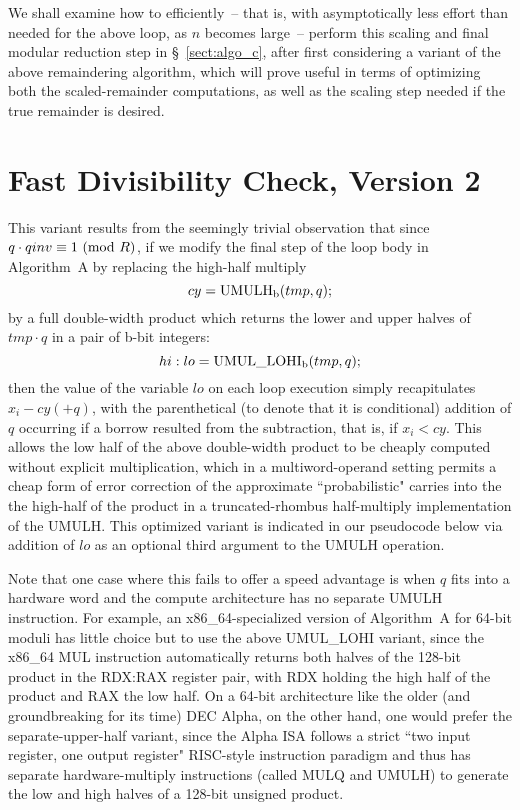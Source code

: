 \documentclass{article}
\begin{document}
We shall examine how to efficiently~-- that is, with asymptotically less effort than needed for the above loop, as $n$ becomes large~-- perform this scaling and final modular reduction step in \S~\ref{sect:algo_c}, after first considering a variant of the above remaindering algorithm, which will prove useful in terms of optimizing both the scaled-remainder computations, as well as the scaling step needed if the true remainder is desired.



\section{Fast Divisibility Check, Version 2}
\label{sect:algo_b}

This variant results from the seemingly trivial observation that since $q \cdot qinv \equiv 1\ ({\rm mod}\ R)$, if we modify the final step of the loop body in Algorithm~A by replacing the high-half multiply
$$
	cy = {\rm UMULH_b}(tmp, q);
$$
by a full double-width product which returns the lower and upper halves of $tmp \cdot q$ in a pair of b-bit integers:
$$
	hi:lo = {\rm UMUL\_LOHI_b}(tmp, q);
$$
then the value of the variable $lo$ on each loop execution simply recapitulates $x_i - cy (+ q)$, with the parenthetical (to denote that it is conditional) addition of $q$ occurring if a borrow resulted from the subtraction, that is, if $x_i < cy$. This allows the low half of the above double-width product to be cheaply computed without explicit multiplication, which in a multiword-operand setting permits a cheap form of error correction of the approximate ``probabilistic" carries into the the high-half of the product in a truncated-rhombus half-multiply implementation of the UMULH. This optimized variant is indicated in our pseudocode below via addition of $lo$ as an optional third argument to the UMULH operation.

Note that one case where this fails to offer a speed advantage is when $q$ fits into a hardware word and the compute architecture has no separate UMULH instruction. For example, an x86\_64-specialized version of Algorithm~A for 64-bit moduli has little choice but to use the above UMUL\_LOHI variant, since the x86\_64 MUL instruction automatically returns both halves of the 128-bit product in the RDX:RAX register pair, with RDX holding the high half of the product and RAX the low half. On a 64-bit architecture like the older (and groundbreaking for its time) DEC Alpha, on the other hand, one would prefer the separate-upper-half variant, since the Alpha ISA follows a strict ``two input register, one output register" RISC-style instruction paradigm and thus has separate hardware-multiply instructions (called MULQ and UMULH) to generate the low and high halves of a 128-bit unsigned product.
\end{document}
